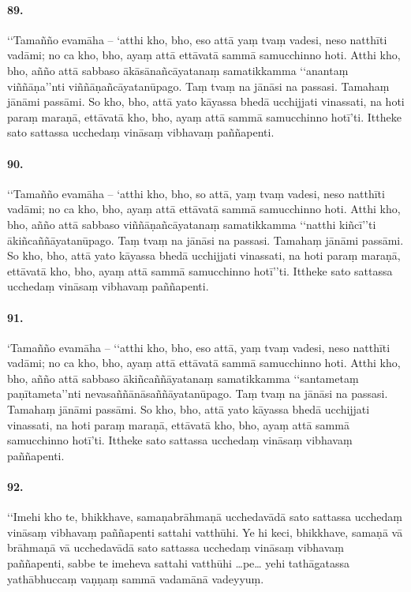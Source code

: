 \paragraph{89.}
‘‘Tamañño evamāha – ‘atthi kho, bho, eso attā yaṃ tvaṃ vadesi, neso natthīti vadāmi; no ca kho, bho, ayaṃ attā ettāvatā sammā samucchinno hoti. Atthi kho, bho, añño attā sabbaso ākāsānañcāyatanaṃ samatikkamma ‘‘anantaṃ viññāṇa’’nti viññāṇañcāyatanūpago. Taṃ tvaṃ na jānāsi na passasi. Tamahaṃ jānāmi passāmi. So kho, bho, attā yato kāyassa bhedā ucchijjati vinassati, na hoti paraṃ maraṇā, ettāvatā kho, bho, ayaṃ attā sammā samucchinno hotī’ti. Ittheke sato sattassa ucchedaṃ vināsaṃ vibhavaṃ paññapenti.

\paragraph{90.}
‘‘Tamañño evamāha – ‘atthi kho, bho, so attā, yaṃ tvaṃ vadesi, neso natthīti vadāmi; no ca kho, bho, ayaṃ attā ettāvatā sammā samucchinno hoti. Atthi kho, bho, añño attā sabbaso viññāṇañcāyatanaṃ samatikkamma ‘‘natthi kiñcī’’ti ākiñcaññāyatanūpago. Taṃ tvaṃ na jānāsi na passasi. Tamahaṃ jānāmi passāmi. So kho, bho, attā yato kāyassa bhedā ucchijjati vinassati, na hoti paraṃ maraṇā, ettāvatā kho, bho, ayaṃ attā sammā samucchinno hotī’’ti. Ittheke sato sattassa ucchedaṃ vināsaṃ vibhavaṃ paññapenti.

\paragraph{91.}
‘Tamañño evamāha – ‘‘atthi kho, bho, eso attā, yaṃ tvaṃ vadesi, neso natthīti vadāmi; no ca kho, bho, ayaṃ attā ettāvatā sammā samucchinno hoti. Atthi kho, bho, añño attā sabbaso ākiñcaññāyatanaṃ samatikkamma ‘‘santametaṃ paṇītameta’’nti nevasaññānāsaññāyatanūpago. Taṃ tvaṃ na jānāsi na passasi. Tamahaṃ jānāmi passāmi. So kho, bho, attā yato kāyassa bhedā ucchijjati vinassati, na hoti paraṃ maraṇā, ettāvatā kho, bho, ayaṃ attā sammā samucchinno hotī’ti. Ittheke sato sattassa ucchedaṃ vināsaṃ vibhavaṃ paññapenti.

\paragraph{92.}
‘‘Imehi kho te, bhikkhave, samaṇabrāhmaṇā ucchedavādā sato sattassa ucchedaṃ vināsaṃ vibhavaṃ paññapenti sattahi vatthūhi. Ye hi keci, bhikkhave, samaṇā vā brāhmaṇā vā ucchedavādā sato sattassa ucchedaṃ vināsaṃ vibhavaṃ paññapenti, sabbe te imeheva sattahi vatthūhi …pe… yehi tathāgatassa yathābhuccaṃ vaṇṇaṃ sammā vadamānā vadeyyuṃ.

